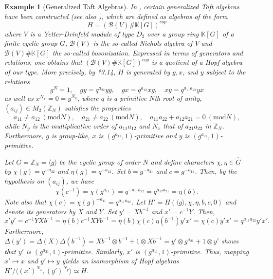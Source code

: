 \documentclass[11pt, twoside]{amsart}
\newtheorem{example}[theorem]{Example}
\theoremstyle{definition}
\newcommand{\ZZ}{\mathbb{Z}}
\newcommand{\KK}{\mathbb{K}}
\begin{document}
\begin{example}[Generalized Taft Algebras]
    In \cite{Halbig}, certain generalized Taft algebras have been constructed (see also \cite{Halbig-Krahmer}), which are defined as algebras of the form
    \[H = \left(\mathcal{B}(V)\# \KK[G] \right)^{cop}\]
    where $V$ is a Yetter-Drinfeld module of type $D_2$ over a group ring $\KK[G]$ of a finite cyclic group $G$, $\mathcal{B}(V)$ is the so-called Nichols algebra of $V$ and $\mathcal{B}(V) \# \KK[G]$ the so-called bosonization. Expressed in terms of generators and relations, one obtains that $\left(\mathcal{B}(V)\# \KK[G] \right)^{cop}$ is a quotient of a Hopf algebra of our type. More precisely, by \cite{Halbig}*{3.14}, $H$ is generated by $g, x$, and $y$ subject to the relations
    \[g^N = 1, \quad gy = q^{a_{22}}yg, \quad gx = q^{a_{12}}xg, \quad xy = q^{a_{11} a_{22}}yx\]
    as well as $x^{N_x} = 0 = y^{N_y}$, where $q$ is a primitive $N$th root of unity, $(a_{ij}) \in M_{2}(\ZZ_N)$ satisfies the properties
    \[a_{11} \neq a_{12}\ (\mathrm{mod }N), \quad a_{21} \neq a_{22}\ (\mathrm{mod } N),\quad a_{11}a_{22} + a_{12}a_{21} = 0\ (\mathrm{mod} N), \]
    while $N_y$ is the multiplicative order of $a_{11}a_{12}$ and $N_x$ that of $a_{21}a_{22}$ in $\ZZ_N$. Furthermore, $g$ is group-like, $x$ is $(g^{a_{11}}, 1)$-primitive and $y$ is $(g^{a_{21}}, 1)$-primitive.

    Let $G = \ZZ_N = \langle g \rangle$ be the cyclic group of order $N$ and define characters $\chi, \eta \in \widehat{G}$ by $\chi(g) = q^{-a_{22}}$ and $\eta(g) = q^{-a_{12}}$. Set $b = g^{-a_{21}}$ and $c = g^{-a_{11}}$. Then, by the hypothesis on $(a_{ij})$, we have 
    \[\chi(c^{-1}) = \chi(g^{a_{11}}) = q^{-a_{11}a_{22}} = q^{a_{12}a_{21}} = \eta(b).\]
    Note also that $\chi(c) = \chi(g)^{-a_{11}} = q^{a_{11}a_{22}}$. Let $H' = H(\langle g \rangle, \chi, \eta, b, c, 0)$ and denote its generators by $X$ and $Y$. Set $y' = Xb^{-1}$ and $x' = c^{-1}Y$. Then,
    \[x' y' = c^{-1} YXb^{-1} = \eta(b)c^{-1}XYb^{-1} = \eta(b)\chi(c)\eta(b^{-1})y' x' = \chi(c)y' x' = q^{a_{11}a_{22}}y'x'.\]
    Furthermore, $\Delta(y') = \Delta(X)\Delta(b^{-1}) = Xb^{-1} \otimes b^{-1} + 1 \otimes Xb^{-1} = y' \otimes g^{a_{21}} + 1 \otimes y'$ shows that $y'$ is $(g^{a_{21}}, 1)$-primitive. Similarly, $x'$ is $(g^{a_{11}}, 1)$-primitive. Thus, mapping $x' \mapsto x$ and $y' \mapsto y$ yields an isomorphism of Hopf algebras $H'/ \langle(x')^{N_x}, (y')^{N_y}\rangle \simeq H$. 
\end{example}
\end{document}
